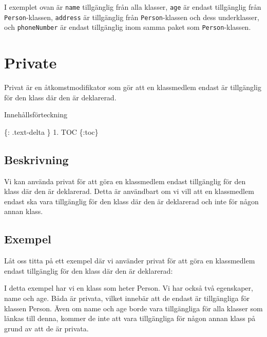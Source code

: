 I exemplet ovan är \texttt{name} tillgänglig från alla klasser,
\texttt{age} är endast tillgänglig från \texttt{Person}-klassen,
\texttt{address} är tillgänglig från \texttt{Person}-klassen och dess
underklasser, och \texttt{phoneNumber} är endast tillgänglig inom samma
paket som \texttt{Person}-klassen.

\hypertarget{private}{%
\section{Private}\label{private}}

Privat är en åtkomstmodifikator som gör att en klassmedlem endast är
tillgänglig för den klass där den är deklarerad.

Innehållsförteckning

\{: .text-delta \} 1. TOC \{:toc\}

\hypertarget{beskrivning}{%
\subsection{Beskrivning}\label{beskrivning}}

Vi kan använda privat för att göra en klassmedlem endast tillgänglig för
den klass där den är deklarerad. Detta är användbart om vi vill att en
klassmedlem endast ska vara tillgänglig för den klass där den är
deklarerad och inte för någon annan klass.

\hypertarget{exempel}{%
\subsection{Exempel}\label{exempel}}

Låt oss titta på ett exempel där vi använder privat för att göra en
klassmedlem endast tillgänglig för den klass där den är deklarerad:

\hypertarget{cb1}{}
\begin{Shaded}
\begin{Highlighting}[]
 \OperatorTok{\{}
     \OperatorTok{;}
     \OperatorTok{;}
\OperatorTok{\}}
\end{Highlighting}
\end{Shaded}

I detta exempel har vi en klass som heter Person. Vi har också två
egenskaper, name och age. Båda är privata, vilket innebär att de endast
är tillgängliga för klassen Person. Även om name och age borde vara
tillgängliga för alla klasser som länkas till denna, kommer de inte att
vara tillgängliga för någon annan klass på grund av att de är privata.


